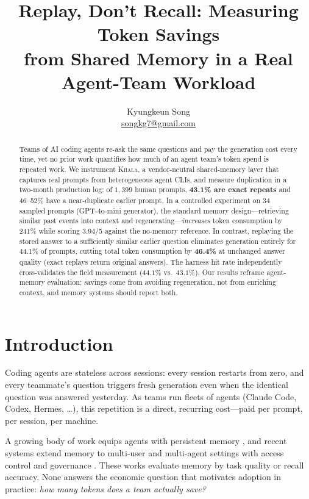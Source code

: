 \documentclass{article}
\title{Replay, Don't Recall: Measuring Token Savings\\ from Shared Memory in a Real Agent-Team Workload}
\author{
  Kyungkeun Song \\
  \href{mailto:songkg7@gmail.com}{songkg7@gmail.com}
}
\newcommand{\khala}{\textsc{Khala}}
\begin{document}
\maketitle

\begin{abstract}
Teams of AI coding agents re-ask the same questions and pay the generation
cost every time, yet no prior work quantifies how much of an agent team's
token spend is repeated work. We instrument \khala{}, a vendor-neutral
shared-memory layer that captures real prompts from heterogeneous agent CLIs,
and measure duplication in a two-month production log: of $1{,}399$ human
prompts, \textbf{43.1\% are exact repeats} and 46--52\% have a
near-duplicate earlier prompt. In a controlled experiment on 34 sampled
prompts (GPT-4o-mini generator), the standard memory design---retrieving
similar past events into context and regenerating---\emph{increases} token
consumption by 241\% while scoring 3.94/5 against the no-memory reference.
In contrast, replaying the stored answer to a sufficiently similar earlier
question eliminates generation entirely for 44.1\% of prompts, cutting total
token consumption by \textbf{46.4\%} at unchanged answer quality (exact
replays return original answers). The harness hit rate independently
cross-validates the field measurement ($44.1\%$ vs.\ $43.1\%$). Our results
reframe agent-memory evaluation: savings come from avoiding regeneration,
not from enriching context, and memory systems should report both.
\end{abstract}

\section{Introduction}
Coding agents are stateless across sessions: every session restarts from
zero, and every teammate's question triggers fresh generation even when the
identical question was answered yesterday. As teams run fleets of agents
(Claude Code, Codex, Hermes, \dots), this repetition is a direct, recurring
cost---paid per prompt, per session, per machine.

A growing body of work equips agents with persistent memory
\citep{packer2023memgpt,chhikara2025mem0,rasmussen2025zep}, and recent
systems extend memory to multi-user and multi-agent settings with access
control and governance
\citep{kim2025collaborative,samep2025,governed2026}. These works evaluate
memory by task quality or recall accuracy. None answers the economic
question that motivates adoption in practice: \emph{how many tokens does a
team actually save?}
\end{document}

